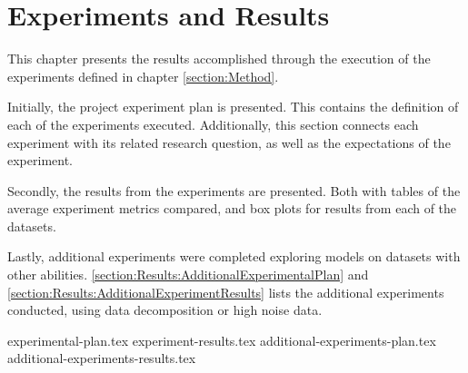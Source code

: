 \chapter{Experiments and Results}
\label{section:Results}

This chapter presents the results accomplished through the execution of the experiments defined in chapter \cref{section:Method}.

Initially, the project experiment plan is presented.
This contains the definition of each of the experiments executed.
Additionally, this section connects each experiment with its related research question,
as well as the expectations of the experiment.

Secondly, the results from the experiments are presented.
Both with tables of the average experiment metrics compared, and box plots for results from each of the datasets.

Lastly, additional experiments were completed exploring models on datasets with other abilities.
\cref{section:Results:AdditionalExperimentalPlan} and \cref{section:Results:AdditionalExperimentResults}
lists the additional experiments conducted, using data decomposition or high noise data.


{experimental-plan.tex}
{experiment-results.tex}
{additional-experiments-plan.tex}
{additional-experiments-results.tex}




\iffalse

  \section{Experimental Setup}
  \label{sec:experimentalSetup}

  The experimental setup should include all data - parameters etc, that would allow a person to repeat your experiments.

  \section{Experimental Results}
  \label{sec:experimentalResults}

  Results should be clearly displayed and should provide a suitable representation of your results for the points you wish to make. Graphs should be labeled in a legible font and if more than one result is displayed on the same graph then these should be clearly marked.   Please choose carefully rather than presenting every results. Too much information is hard to read and often hides the key information you wish to present. Make use of statistical methods when presenting results, where possible to strengthen the results.  Further, the format of the presentation of results should be chosen based on what issues in the results you wish to highlight. You may wish to present a subset in the experimental section and provide additional results in the appendix.
\fi